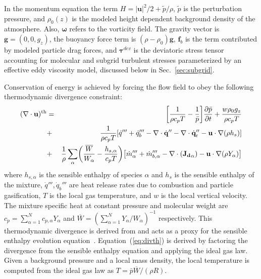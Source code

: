\documentclass[journal,article,atmosphere,submit,moreauthors,pdftex]{Definitions/mdpi}
\begin{document}
In the momentum equation the term $H=|\mathbf{u}|^2/2 + \tilde{p}/\rho$, $\tilde{p}$ is the perturbation pressure, and $\rho_0(z)$ is the modeled height dependent background density of the atmosphere.  Also, $\boldsymbol{\omega}$ refers to the vorticity field. The gravity vector is $\mathbf{g}=(0,0,g_z)$, the buoyancy force term is $ (\rho-\rho_0) \mathbf{g}$, $\mathbf{f}_{b}$ is the term contributed by modeled particle drag forces, and $\boldsymbol{\tau}^{dev}$ is the deviatoric stress tensor accounting for molecular and subgrid turbulent stresses parameterized by an effective eddy viscosity model, discussed below in Sec.~\ref{sec:subgrid}.

Conservation of energy is achieved by forcing the flow field to obey the following thermodynamic divergence constraint:
\begin{eqnarray}
    ( \nabla \cdot \mathbf{u} )^{\rm th} &=&
    \left[ \frac{1}{\rho c_p T} - \frac{1}{\bar{p}} \right]
    \frac{\partial \bar{p}}{\partial t} + \frac{w \rho_0 g_z}{\rho c_p T} \nonumber \\
    &+& \frac{1}{\rho c_p T} \left[ \dot{q}''' + \dot{q}_b''' - \nabla \cdot \dot{\mathbf{q}}'' - \nabla \cdot \dot{\mathbf{q}}_{\rm r}'' - \mathbf{u} \cdot \nabla (\rho h_s) \right] \nonumber \\
    &+& \frac{1}{\rho} \sum_\alpha \left( \frac{\overline{W}}{W_\alpha} - \frac{h_{s,\alpha}}{c_p T} \right) \left[ \dot{m}_\alpha'''  + \dot{m}_{b,\alpha}''' - \nabla \cdot (\mathbf{J_{d}}_\alpha) - \mathbf{u} \cdot \nabla (\rho Y_\alpha) \right] \label{eq:divth}
\end{eqnarray}
where $h_{s,\alpha}$ is the sensible enthalpy of species $\alpha$ and $h_s$ is the sensible enthalpy of the mixture, $\dot{q}''', \dot{q}_b'''$ are heat release rates due to combustion and particle gasification, $T$ is the local gas temperature, and $w$ is the local vertical velocity. The mixture specific heat at constant pressure and molecular weight are $c_p=\sum_{\alpha =1}^N{c_{p,\alpha} Y_\alpha}$ and $\overline{W}=\left(\sum_{\alpha =1}^N{Y_\alpha /W_\alpha} \right)^{-1}$ respectively. This thermodynamic divergence is derived from and acts as a proxy for the sensible enthalpy evolution equation~\cite{mcdermo_2014}. Equation~(\ref{eq:divth}) is derived by factoring the divergence from the sensible enthalpy equation and applying the ideal gas law.  Given a background pressure and a local mass density, the local temperature is computed from the ideal gas law as $T = \bar{p} \overline{W} / (\rho R) $.
\end{document}
